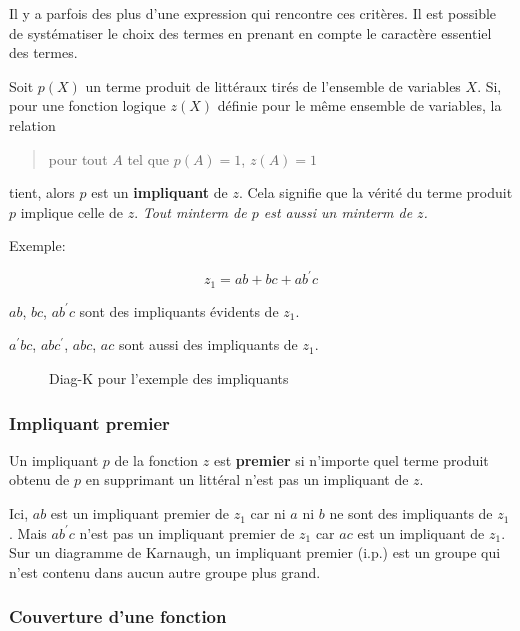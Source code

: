 \documentclass[11pt]{article}
\begin{document}
Il y a parfois des plus d'une expression qui rencontre ces
critères. Il est possible de systématiser le choix des termes en
prenant en compte le caractère essentiel des termes.

Soit \(p(X)\) un terme produit de littéraux tirés de l'ensemble de
variables \(X\). Si, pour une fonction logique \(z(X)\) définie pour le
même ensemble de variables, la relation

\begin{quote}
pour tout \(A\) tel que \(p(A)=1\), \(z(A)=1\)
\end{quote}

tient, alors \(p\) est un \textbf{impliquant} de \(z\). Cela signifie que la
vérité du terme produit \(p\) implique celle de \(z\). \emph{Tout minterm de
\(p\) est aussi un minterm de \(z\).}

Exemple:

$$z_1 = ab + bc + a b^{\prime} c$$ 

\(a b\), \(b c\), \(a b^{\prime} c\) sont des impliquants évidents de \(z_1\).

\(a^{\prime} b c\), \(a b c^{\prime}\), \(a b c\), \(a c\) sont aussi des
impliquants de \(z_1\).

\begin{figure}[htbp]
\centering

\caption{\label{fig:orgc8c2e0d}Diag-K pour l'exemple des impliquants}
\end{figure}

\subsubsection{Impliquant premier}
\label{sec:org64d1ce6}

Un impliquant \(p\) de la fonction \(z\) est \textbf{premier} si n'importe quel
terme produit obtenu de \(p\) en supprimant un littéral n'est pas un
impliquant de \(z\).

Ici, \(a b\) est un impliquant premier de \(z_1\) car ni \(a\) ni \(b\) ne
sont des impliquants de \(z_1\). Mais \(a b^{\prime} c\) n'est pas un
impliquant premier de \(z_1\) car \(a c\) est un impliquant de \(z_1\).
Sur un diagramme de Karnaugh, un impliquant premier (i.p.) est un
groupe qui n'est contenu dans aucun autre groupe plus grand.

\subsubsection{Couverture d'une fonction}
\label{sec:orgceaba32}
\end{document}
